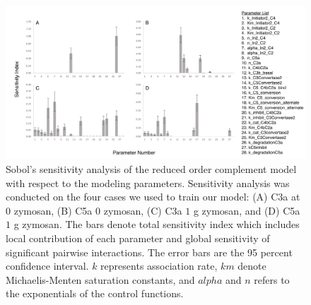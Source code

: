\documentclass[12pt]{article}
\begin{document}
\begin{figure}[h]
\centering
\includegraphics[width=1.0\textwidth]{./Figures/Figure4_Sensitivity_Analysis_v2.pdf}
\caption{Sobol's sensitivity analysis of the reduced order complement model with respect to the modeling parameters.  Sensitivity analysis was conducted on the four cases we used to train our model: (A) C3a at $0$ zymosan, (B) C5a $0$ zymosan, (C) C3a $1$ g zymosan, and (D) C5a $1$ g zymosan. The bars denote total sensitivity index which includes local contribution of each parameter and global sensitivity of significant pairwise interactions. The error bars are the 95 percent confidence interval. $k$ represents association rate, $km$ denote Michaelis-Menten saturation constants, and $alpha$ and $n$ refers to the exponentials of the control functions.}
\label{fig-SA}
\end{figure}
\end{document}
